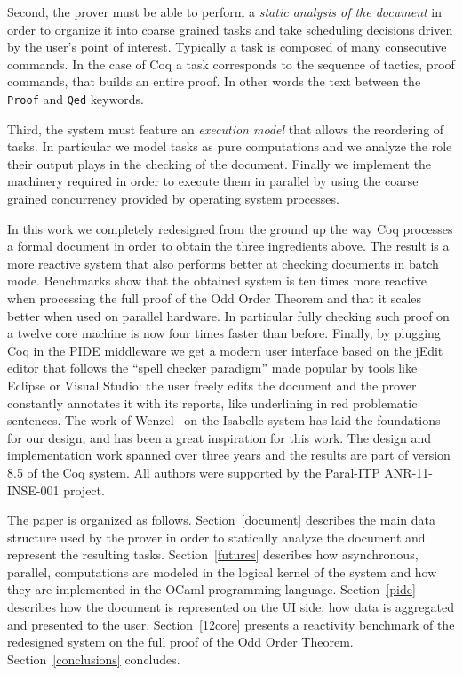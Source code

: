 \documentclass[runningheads,a4paper,oribibl]{llncs}
\newcommand{\tmverbatim}[1]{\lstinline|#1|}
\begin{document}
Second, the prover must be able to perform a \emph{static analysis of
the document} in order to organize it into coarse grained tasks and
take scheduling decisions driven by the user's point of
interest.  Typically a task is composed of many consecutive commands.
In the case of Coq a task corresponds to the sequence of tactics,
proof commands, that builds an entire proof.  In other words the text between
the \tmverbatim{Proof} and \tmverbatim{Qed} keywords.

Third, the system must feature an \emph{execution model} that allows
the reordering of tasks.  In particular we model tasks as pure
computations and we analyze the role their output plays in the checking
of the document. Finally we implement the machinery required in order
to execute them in parallel by using the coarse grained concurrency
provided by operating system processes.

In this work we completely redesigned from the ground up
the way Coq processes a formal document
in order to obtain the three
ingredients above.  The result is a more reactive system that also
performs better at checking documents in batch mode.  Benchmarks show
that the obtained system is ten times more reactive when processing
the full proof of the Odd Order Theorem and that it scales better when
used on parallel hardware.  In particular fully checking such proof on
a twelve core machine is now four times faster than before.  Finally,
by plugging Coq in the PIDE middleware we get a modern user interface
based on the jEdit editor that follows the ``spell checker paradigm''
made popular by tools like Eclipse or Visual Studio: the user
freely edits the document and the prover constantly annotates it with
its reports, like underlining in red problematic sentences.
The work of
Wenzel~\cite{Wenzel_parallelproof,DBLP:conf/mkm/Wenzel11,DBLP:journals/corr/Wenzel13,Wenzel14} on the
Isabelle system has laid the foundations for our design, and has been
a great inspiration for this work.  The design and implementation work
spanned over three years and the results are part of version 8.5 of
the Coq system.  All authors were supported by the Paral-ITP
ANR-11-INSE-001 project.

The paper is organized as follows.  Section~\ref{document} describes
the main data structure used by the prover in order to statically
analyze the document and represent the resulting tasks.
Section~\ref{futures} describes how asynchronous, parallel,
computations are modeled in the logical kernel of the system and how
they are implemented in the OCaml programming language.
Section~\ref{pide} describes how the document is represented on the UI
side, how data is aggregated and presented to the user.
Section~\ref{12core} presents a reactivity benchmark of the redesigned
system on the full proof of the Odd Order Theorem.
Section~\ref{conclusions} 
concludes.
\end{document}
